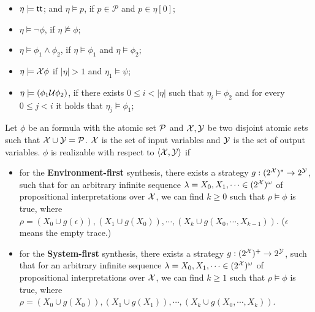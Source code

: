 \begin{itemize}%
  \item $\eta\models\true$; and $\eta\models p$, if $p\in\mathcal{P}$ and $p\in\eta[0]$;
  \item $\eta\models\neg\phi$, if $\eta\not\models\phi$;
  \item $\eta\models\phi_1\wedge\phi_2$,  if $\eta\models\phi_1$ and $\eta\models\phi_2$;
  \item $\eta\models \X\phi$ if $|\eta|>1$ and $\eta_1\models\psi$;
  \item $\eta\models (\phi_1 \U\phi_2)$, if there exists $0\leq i < |\eta|$
  such that $\eta_i\models\phi_2$ and for every $0\leq j < i$ it holds that $\eta_j\models\phi_1$;
  \end{itemize}


\begin{definition}\label{def:synthesis}
Let $\phi$ be an \ltlf formula with the atomic set $\P$ and $\X,\Y$ be two disjoint atomic sets such that $\X\cup \Y= \P$. $\X$ is the set of input variables and $\Y$ is the set of output variables. $\phi$ is realizable with respect to $\langle \X,\Y\rangle$ if 
\begin{itemize}
\item for the \textbf{Environment-first} synthesis, there exists a strategy $g: (2^\X)^* \to 2^\Y$, such that for an arbitrary infinite sequence $\lambda = X_0, X_1, \cdots \in (2^\X)^\omega$ of propositional interpretations over $\X$, we can find $k \geq 0$ such that $\rho\models\phi$ is true, where $\rho=(X_0\cup g(\epsilon)),(X_1\cup g(X_0)),\cdots,(X_k\cup g(X_0,\cdots,X_{k-1}))$. ($\epsilon$ means the empty trace.) 
\item for the \textbf{System-first} synthesis, there exists a strategy $g: (2^\X)^+ \to 2^\Y$, such that for an arbitrary infinite sequence $\lambda = X_0, X_1, \cdots \in (2^\X)^\omega$ of propositional interpretations over $\X$, we can find $k \geq 1$ such that $\rho\models\phi$ is true, where $\rho=(X_0\cup g(X_0)),(X_1\cup g(X_1)),\cdots,(X_k\cup g(X_0,\cdots,X_{k}))$. 
\end{itemize}
\end{definition}

